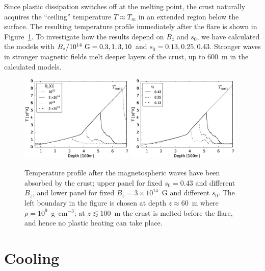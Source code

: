 Since plastic dissipation switches off at the melting point, the crust naturally acquires the ``ceiling'' temperature $T\approx T_m$ in an extended region below the surface.
The resulting temperature profile immediately after the flare is shown in Figure~\ref{fig7}.
To investigate how the results depend on $B_z$ and $s_0$, we have calculated the models with $B_z/10^{14}{\rm ~G}=0.3,1,3,10$ and $s_0=0.13,0.25,0.43$. 
Stronger waves in stronger magnetic fields melt deeper layers of the crust, up to 600~m in the calculated models.
\begin{figure} [h]
\centering
\includegraphics[width=0.48\textwidth]{pics/chap3/fig7_1.eps}
\includegraphics[width=0.48\textwidth]{pics/chap3/fig7_2.eps} 
\caption[Temperature profile after the magnetospheric \alfven waves have been 
absorbed by the crust]{Temperature profile after the magnetospheric \alfven waves have been absorbed by the crust; upper panel for fixed $s_0=0.43$ and different $B_z$, and lower panel for fixed  $B_z=3\times 10^{14}$~G and different $s_0$. 
The left boundary in the figure is chosen at depth $z\approx 60$~m where $\rho = 10^9$~g~cm$^{-3}$; at $z\lesssim 100$~m the crust is melted before the flare, and hence no plastic heating can take place.}
\label{fig7}
\end{figure}

\section{Cooling}

